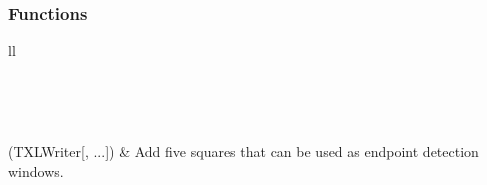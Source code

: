 \documentclass[letterpaper,10pt,english]{sphinxmanual}
\begin{document}
\subsubsection{Functions}
\label{Chapters/PythonModuleReference/ShapeLibrary/TXLWizard.ShapeLibrary.EndpointDetectionWindows:functions}
\begin{longtable}{ll}
\hline
\endfirsthead

%
{{}} \\
\hline
\endhead

\hline {} \\ \hline
\endfoot

\endlastfoot


{\hyperref[Chapters/PythonModuleReference/ShapeLibrary/TXLWizard.ShapeLibrary.EndpointDetectionWindows:TXLWizard.ShapeLibrary.EndpointDetectionWindows.GetEndpointDetectionWindows]{}}(TXLWriter{[}, ...{]})
 & 
Add five squares that can be used as endpoint detection windows.
\\
\hline\end{longtable}

\end{document}

